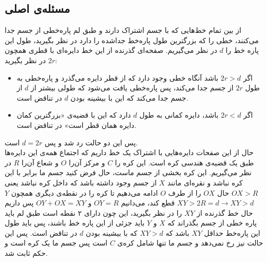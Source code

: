 \documentclass[12pt,a4paper]{article}
\begin{document}
\subsection*{مسئله‌ی اصلی}
از بین تمام خط‌هایی که با جسم اشتراک دارند و طبق لم پاره‌خطی از جسم جدا می‌کنند، خطی را که بزرگترین طول پاره‌خط جداشده را دارد در نظر بگیرید، طول این پاره خط را $d$ در نظر می‌گیریم. صفحه‌ای گذرنده از این خط دایره‌ای با قطری همچون $2r$ در نظر بگیرید:
\begin{itemize}
\item
 اگر $2r>d$ باشد آنگاه خطی وجود دارد که از قطر دایره می‌گذرد و پاره‌خطی به طول $2r$ از جسم جدا می‌کند، پس پاره‌خطی یافت می‌شود که طولی بیشتر از $d$ از جسم جدا می‌کند که این با بیشینه بودن $d$ در تناقض است.
 \item
 اگر $2r < d$ باشد، دایره کمانی به طول $d$ دارد که این با قضیه‌ی «بزرگترین کمان دایره همان قطر است» در تناقض است.
\end{itemize}
پس این دو حالت رد شد و پس $d = 2r$ است.
\\
حال از این صفحات دایره‌هایی با اشتراک یک خط داریم که اجتماع همه‌ی این دایره‌ها طبق یک قضیه‌ی هندسی کره است. این کره را $C$ و مرکز آن‌را $O$  و شعاع آن‌را $R$ در نظر می‌گیریم.
این کره بخشی از جسم ماست، حال فرض کنید جسم ما برابر با این کره نباشد و نقره‌ای مانند $X$ از جسم وجود داشته باشد که داخل کره نباشد یعنی $OX > R$
حال $OX$ را از طرف $O$ ادامه می‌دهیم تا کره را در نقطه‌ی دیگری همچون $Y$ قطع کند، می‌دانیم
$OY = R$
و 
$OY+OX = XY$
پس داریم
$XY > 2R = d \rightarrow XY > d$
\\
حال خط گذرنده از $XY$ را در نظر بگیرید، این چون دارای ۲ نقطه است طبق لم باید پاره خطی از جسم بگذراند که $X$ و $Y$ باید جزئی از این پاره ‌خط باشند، پس باید طول این پاره‌خط حداقل $XY$ باشد که $XY > d$ که با بیشینه بودن $d$ در تناقض است.
پس این حالت نیز رخ نمی‌دهد و جسم ما تنها شامل کره‌ی $C$ است پس جسم ما یک کره است و حکم ثابت شد.
\end{document}
